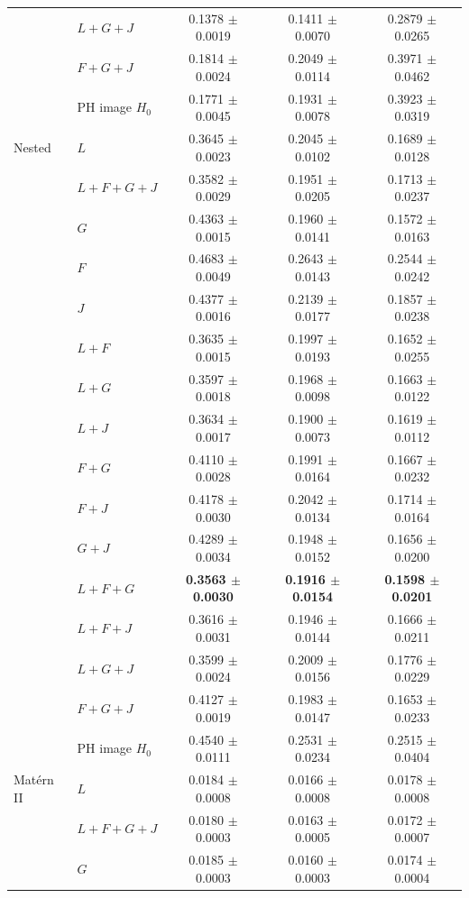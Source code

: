 \documentclass[10pt,a4paper]{article}
\newcommand{\B}[1]{\textbf{#1}}
\begin{document}
\begin{longtable}{@{}ll ccc@{}}
 & $L{+}G{+}J$ & 0.1378 $\pm$ 0.0019 & 0.1411 $\pm$ 0.0070 & 0.2879 $\pm$ 0.0265\\
 & $F{+}G{+}J$ & 0.1814 $\pm$ 0.0024 & 0.2049 $\pm$ 0.0114 & 0.3971 $\pm$ 0.0462\\
 & PH image $H_0$ & 0.1771 $\pm$ 0.0045 & 0.1931 $\pm$ 0.0078 & 0.3923 $\pm$ 0.0319\\
\midrule
Nested & $L$ & 0.3645 $\pm$ 0.0023 & 0.2045 $\pm$ 0.0102 & 0.1689 $\pm$ 0.0128\\
 & $L{+}F{+}G{+}J$ & 0.3582 $\pm$ 0.0029 & 0.1951 $\pm$ 0.0205 & 0.1713 $\pm$ 0.0237\\
 & $G$ & 0.4363 $\pm$ 0.0015 & 0.1960 $\pm$ 0.0141 & 0.1572 $\pm$ 0.0163\\
 & $F$ & 0.4683 $\pm$ 0.0049 & 0.2643 $\pm$ 0.0143 & 0.2544 $\pm$ 0.0242\\
 & $J$ & 0.4377 $\pm$ 0.0016 & 0.2139 $\pm$ 0.0177 & 0.1857 $\pm$ 0.0238\\
 & $L{+}F$ & 0.3635 $\pm$ 0.0015 & 0.1997 $\pm$ 0.0193 & 0.1652 $\pm$ 0.0255\\
 & $L{+}G$ & 0.3597 $\pm$ 0.0018 & 0.1968 $\pm$ 0.0098 & 0.1663 $\pm$ 0.0122\\
 & $L{+}J$ & 0.3634 $\pm$ 0.0017 & 0.1900 $\pm$ 0.0073 & 0.1619 $\pm$ 0.0112\\
 & $F{+}G$ & 0.4110 $\pm$ 0.0028 & 0.1991 $\pm$ 0.0164 & 0.1667 $\pm$ 0.0232\\
 & $F{+}J$ & 0.4178 $\pm$ 0.0030 & 0.2042 $\pm$ 0.0134 & 0.1714 $\pm$ 0.0164\\
 & $G{+}J$ & 0.4289 $\pm$ 0.0034 & 0.1948 $\pm$ 0.0152 & 0.1656 $\pm$ 0.0200\\
 & \B{$L{+}F{+}G$} & \B{0.3563 $\pm$ 0.0030} & \B{0.1916 $\pm$ 0.0154} & \B{0.1598 $\pm$ 0.0201}\\
 & $L{+}F{+}J$ & 0.3616 $\pm$ 0.0031 & 0.1946 $\pm$ 0.0144 & 0.1666 $\pm$ 0.0211\\
 & $L{+}G{+}J$ & 0.3599 $\pm$ 0.0024 & 0.2009 $\pm$ 0.0156 & 0.1776 $\pm$ 0.0229\\
 & $F{+}G{+}J$ & 0.4127 $\pm$ 0.0019 & 0.1983 $\pm$ 0.0147 & 0.1653 $\pm$ 0.0233\\
 & PH image $H_0$ & 0.4540 $\pm$ 0.0111 & 0.2531 $\pm$ 0.0234 & 0.2515 $\pm$ 0.0404\\
\midrule
Mat\'ern II & $L$ & 0.0184 $\pm$ 0.0008 & 0.0166 $\pm$ 0.0008 & 0.0178 $\pm$ 0.0008\\
 & $L{+}F{+}G{+}J$ & 0.0180 $\pm$ 0.0003 & 0.0163 $\pm$ 0.0005 & 0.0172 $\pm$ 0.0007\\
 & $G$ & 0.0185 $\pm$ 0.0003 & 0.0160 $\pm$ 0.0003 & 0.0174 $\pm$ 0.0004\\

\end{longtable}
\end{document}
